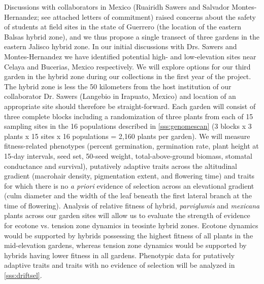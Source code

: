 Discussions with collaborators in Mexico (Ruairidh Sawers and Salvador Montes-Hernandez; see attached letters of commitment) raised concerns about the safety of students at field sites in the state of Guerrero (the location of the eastern Balsas hybrid zone), and we thus propose a single transect of three gardens in the eastern Jalisco hybrid zone. 
In our initial discussions with Drs. Sawers and Montes-Hernandez we have identified potential high- and low-elevation sites near Celaya and Bucerias, Mexico respectively.  
We will explore options for our third garden in the hybrid zone during our collections in the first year of the project.
The hybrid zone is less the 50 kilometers from the host institution of our collaborator Dr. Sawers (Langebio in Irapuato, Mexico) and location of an appropriate site should therefore be straight-forward.
Each garden will consist of three complete blocks including a randomization of three plants from each of 15 sampling sites in the 16 populations described in \ref{sss:genomescan} (3 blocks x 3 plants x 15 sites x 16 populations = 2,160 plants per garden).  We will measure fitness-related phenotypes (percent germination, germination rate, plant height at 15-day intervals, seed set, 50-seed weight, total-above-ground biomass, stomatal conductance and survival), putatively adaptive traits across the altitudinal gradient (macrohair density, pigmentation extent, and flowering time) and traits for which there is no \emph{a priori} evidence of selection across an elevational gradient (culm diameter and the width of the leaf beneath the first lateral branch at the time of flowering).  Analysis of relative fitness of hybrid, \emph{parviglumis} and \emph{mexicana} plants across our garden sites will allow us to evaluate the strength of evidence for ecotone vs. tension zone dynamics in teosinte hybrid zones.  Ecotone dynamics would be supported by hybrids possessing the highest fitness of all plants in the mid-elevation gardens, whereas tension zone dynamics would be supported by hybrids having lower fitness in all gardens.  Phenotypic data for putatively adaptive traits and traits with no evidence of selection will be analyzed in \ref{sss:driftsel}.
		
